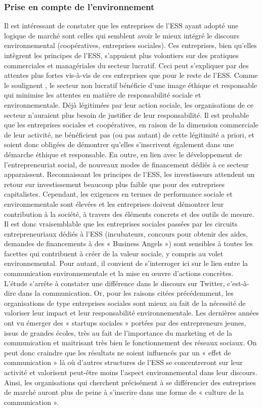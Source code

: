         \subsubsection{Prise en compte de l’environnement}

            Il est intéressant de constater que les entreprises de l’ESS ayant adopté une logique de marché sont celles qui semblent avoir le mieux intégré le discours environnemental (coopératives, entreprises sociales). Ces entreprises, bien qu’elles intègrent les principes de l’ESS, s’appuient plus volontiers sur des pratiques commerciales et managériales du secteur lucratif. Ceci peut s’expliquer par des attentes plus fortes vis-à-vis de ces entreprises que pour le reste de l’ESS.  Comme le soulignent \textcite{dart2010green}, le secteur non lucratif bénéficie d’une image éthique et responsable qui minimise les attentes en matière de responsabilité sociale et environnementale. Déjà légitimées par leur action sociale, les organisations de ce secteur n’auraient plus besoin de justifier de leur responsabilité. Il est probable que les entreprises sociales et coopératives, en raison de la dimension commerciale de leur activité, ne bénéficient pas (ou pas autant) de cette légitimité a priori, et soient donc obligées de démontrer qu’elles s’inscrivent également dans une démarche éthique et responsable. En outre, en lien avec le développement de l’entrepreneuriat social, de nouveaux modes de financement dédiés à ce secteur apparaissent. Reconnaissant les principes de l’ESS, les investisseurs attendent un retour sur investissement beaucoup plus faible que pour des entreprises capitalistes. Cependant, les exigences en termes de performance sociale et environnementale sont élevées et les entreprises doivent démontrer leur contribution à la société, à travers des éléments concrets et des outils de mesure. Il est donc vraisemblable que les entreprises sociales passées par les circuits entrepreneuriaux dédiés à l’ESS (incubateurs, concours pour obtenir des aides, demandes de financements à des « Business Angels ») sont sensibles à toutes les facettes qui contribuent à créer de la valeur sociale, y compris au volet environnemental. Pour autant, il convient de s’interroger ici sur le lien entre la communication environnementale et la mise en œuvre d’actions concrètes. L’étude s’arrête à constater une différence dans le discours sur Twitter, c’est-à-dire dans la communication. Or, pour les raisons citées précédemment, les organisations de type entreprises sociales sont mieux au fait de la nécessité de valoriser leur impact et leur responsabilité environnementale. Les dernières années ont vu émerger des « startups sociales » portées par des entrepreneurs jeunes, issus de grandes écoles, très au fait de l’importance du marketing et de la communication et maitrisant très bien le fonctionnement des réseaux sociaux. On peut donc craindre que les résultats ne soient influencés par un « effet de communication » là où d’autres structures de l’ESS se concentreront sur leur activité et valorisent peut-être moins l’aspect environnemental dans leur discours. Ainsi, les organisations qui cherchent précisément à se différencier des entreprises de marché auront plus de peine à s’inscrire dans une forme de « culture de la communication ». 